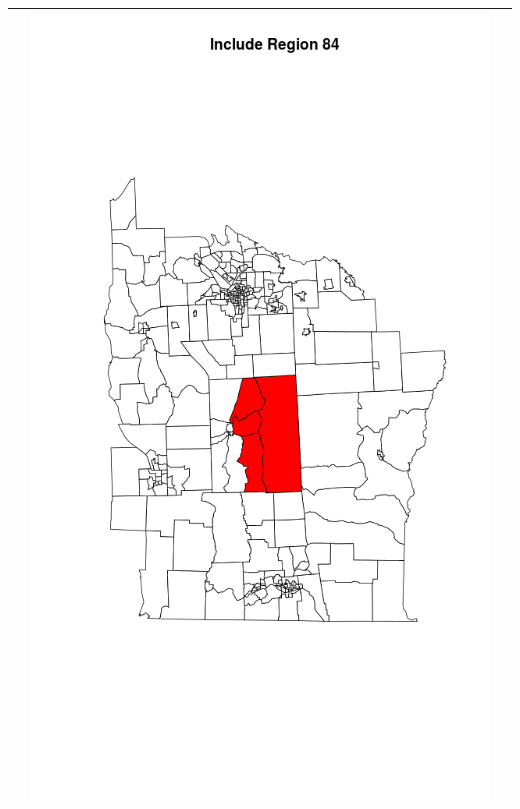 \documentclass[12pt]{article}
\begin{document}
\begin{tabular}{|c|c|c|}
							   & \includegraphics[scale=0.2]{ny84.png} \\ \hline

\end{tabular}
\end{document}

